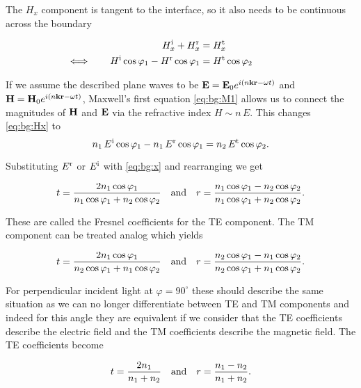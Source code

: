 The $H_x$ component is tangent to the interface, so it also needs to be continuous across the boundary

\begin{equation}\label{eq:bg:Hx}
\begin{aligned}
     H^{\mathrm{i}}_x +  H^{\mathrm{r}}_x &=  H^{\mathrm{t}}_x \\
    \Longleftrightarrow \qquad
    H^{\mathrm{i}} \cos \varphi_1 - H^{\mathrm{r}} \cos \varphi_1 &= H^{\mathrm{t}} \cos \varphi_2
    \qquad  \qquad
\end{aligned}
\end{equation}

If we assume the described plane waves to be
$\vb E = \vb E_0 e^{i(n \vb k \vb r - \omega t)}$
and 
$\vb H = \vb H_0 e^{i(n \vb k \vb r - \omega t)}$,
Maxwell's first equation \eqref{eq:bg:M1} allows us to connect the magnitudes of $\vb H$ and $\vb E$ via the refractive index $H \sim n \, E$. This changes \eqref{eq:bg:Hx} to
\begin{equation}
    n_1 \, E^{\mathrm{i}} \cos \varphi_1 - n_1 \, E^{\mathrm{r}} \cos \varphi_1 =
    n_2 \, E^{\mathrm{t}} \cos \varphi_2.
\end{equation}

Substituting $E^{\mathrm{r}}$ or $E^{\mathrm{i}}$ with \eqref{eq:bg:x} and rearranging we get

\begin{equation}
    t = \frac{2 n_1 \cos \varphi_1}{n_1 \cos \varphi_1 + n_2 \cos \varphi_2}
    \qq{and}
    r = \frac{n_1 \cos \varphi_1 - n_2 \cos \varphi_2}{
    n_1 \cos \varphi_1 + n_2 \cos \varphi_2}.
\end{equation}

These are called the Fresnel coefficients for the TE component. The TM component can be treated analog which yields

\begin{equation}
    t = \frac{2 n_1 \cos \varphi_1}{n_2 \cos \varphi_1 + n_1 \cos \varphi_2}
    \qq{and}
    r = \frac{n_2 \cos \varphi_1 - n_1 \cos \varphi_2}{
    n_2 \cos \varphi_1 + n_1 \cos \varphi_2}.
\end{equation}

For perpendicular incident light at $\varphi = 90^\circ$ these should describe the same situation as we can no longer differentiate between TE and TM components and indeed for this angle they are equivalent if we consider that the TE coefficients describe the electric field and the TM coefficients describe the magnetic field. The TE coefficients become

\begin{equation}
    t = \frac{2 n_1}{n_1 + n_2} \qq{and} r = \frac{n_1 - n_2}{n_1 + n_2}.
\end{equation}

